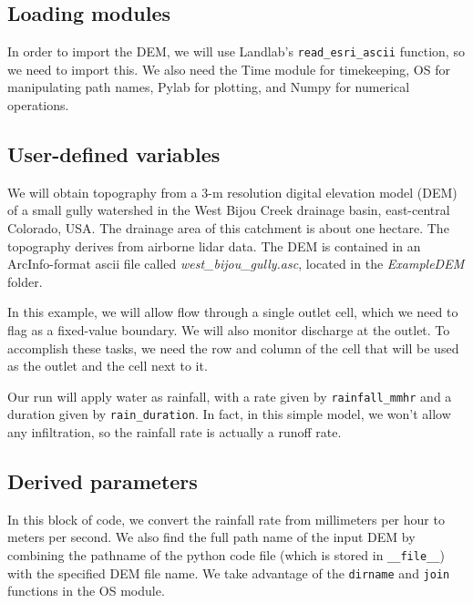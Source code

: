 \documentclass[12pt]{article}
\newcommand{\code}[1]{{\tt #1}}
\begin{document}


\subsection{Loading modules}



In order to import the DEM, we will use Landlab's \code{read\_esri\_ascii} function, so we need to import this. We also need the Time module for timekeeping, OS for manipulating path names, Pylab for plotting, and Numpy for numerical operations. 

\subsection{User-defined variables}



We will obtain topography from a 3-m resolution digital elevation model (DEM) of a small gully watershed in the West Bijou Creek drainage basin, east-central Colorado, USA. The drainage area of this catchment is about one hectare. The topography derives from airborne lidar data. The DEM is contained in an ArcInfo-format ascii file called {\em west\_bijou\_gully.asc}, located in the {\em ExampleDEM} folder.

In this example, we will allow flow through a single outlet cell, which we need to flag as a fixed-value boundary. We will also monitor discharge at the outlet. To accomplish these tasks, we need the row and column of the cell that will be used as the outlet and the cell next to it.

Our run will apply water as rainfall, with a rate given by \code{rainfall\_mmhr} and a duration given by \code{rain\_duration}. In fact, in this simple model, we won't allow any infiltration, so the rainfall rate is actually a runoff rate.

\subsection{Derived parameters}



In this block of code, we convert the rainfall rate from millimeters per hour to meters per second. We also find the full path name of the input DEM by combining the pathname of the python code file (which is stored in \code{\_\_file\_\_}) with the specified DEM file name. We take advantage of the \code{dirname} and \code{join} functions in the OS module.
\end{document}
